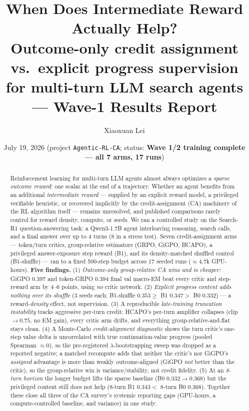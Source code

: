 \documentclass[11pt,a4paper]{article}
\title{\bfseries When Does Intermediate Reward Actually Help?\\
\large Outcome-only credit assignment vs.\ explicit progress supervision\\
for multi-turn LLM search agents --- Wave-1 Results Report}
\author{Xiaoxuan Lei}
\date{July 19, 2026 \quad (project \texttt{Agentic-RL-CA}; status: \textbf{Wave 1/2 training complete --- all 7 arms, 17 runs})}
\begin{document}
\sloppy
\maketitle

\begin{abstract}
Reinforcement learning for multi-turn LLM agents almost always optimizes a \emph{sparse outcome
reward}: one scalar at the end of a trajectory. Whether an agent benefits from an additional
\emph{intermediate reward} --- supplied by an explicit reward model, a privileged verifiable
heuristic, or recovered implicitly by the credit-assignment (CA) machinery of the RL algorithm
itself --- remains unresolved, and published comparisons rarely control for reward density,
compute, or seeds. We ran a controlled study on the Search-R1 question-answering task: a
Qwen3-1.7B agent interleaving reasoning, search calls, and a final answer over up to 4 turns (8 in
a stress test). Seven credit-assignment arms --- token/turn critics, group-relative estimators
(GRPO, GiGPO, HCAPO), a privileged answer-exposure step reward (B1), and its density-matched
shuffled control (B1-shuffle) --- ran to a fixed 500-step budget across 17 seeded runs
($\approx$4.7k GPU-hours). \textbf{Five findings.}
(1) \emph{Outcome-only group-relative CA wins and is cheaper:} GiGPO 0.397 and token-GRPO 0.394
final val macro-EM beat every critic and step-reward arm by 4--6 points, using \emph{no} critic
network. (2) \emph{Explicit progress content adds nothing over its shuffle} (3 seeds each:
B1-shuffle $0.353 \geq$ B1 $0.347 >$ B0 $0.332$) --- a reward-\emph{density} effect, not
supervision. (3) A reproducible \emph{late-training truncation instability} tracks aggressive
per-turn credit: HCAPO's per-turn amplifier collapses (clip $\to0.75$, no EM gain), every critic
arm drifts, and everything group-relative-and-flat stays clean. (4) A Monte-Carlo
\emph{credit-alignment diagnostic} shows the turn critic's one-step value delta is uncorrelated
with true continuation-value progress (pooled Spearman $\approx0$), so the pre-registered
$\lambda$-bootstrapping sweep was dropped as a reported negative; a matched recompute adds that
neither the critic's nor GiGPO's \emph{assigned} advantage is more than weakly outcome-aligned
(GiGPO \emph{not} better than the critic), so the group-relative win is variance/stability, not
credit fidelity. (5) At an \emph{8-turn horizon}
the longer budget lifts the sparse baseline (B0 $0.332\to0.368$) but the privileged content still
does not help (8-turn B1 $0.343 <$ 8-turn B0 $0.368$). Together these close all three of the CA
survey's systemic reporting gaps (GPU-hours, a compute-controlled baseline, and variance) in one
study.
\end{abstract}
\end{document}
